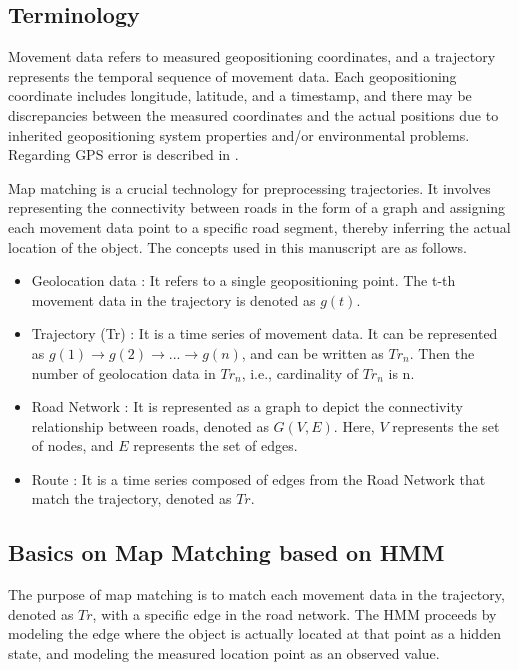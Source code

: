 \documentclass[preprint,12pt]{elsarticle}
\begin{document}
\subsection{Terminology}
\label{sec:sec3:sec1}
Movement data refers to measured geopositioning coordinates, and a trajectory represents the temporal sequence of movement data. Each geopositioning coordinate includes longitude, latitude, and a timestamp, and there may be discrepancies between the measured coordinates and the actual positions due to inherited geopositioning system properties and/or environmental problems. 
Regarding GPS error is described in \cite{gpserror}.

Map matching is a crucial technology for preprocessing trajectories. It involves representing the connectivity between roads in the form of a graph and assigning each movement data point to a specific road segment, thereby inferring the actual location of the object.
The concepts used in this manuscript are as follows.
\begin{itemize}
	\item Geolocation data : It refers to a single geopositioning point. The t-th movement data in the trajectory is denoted as $g(t)$.
	\item Trajectory (Tr) : It is a time series of movement data. It can be represented as $g(1) \rightarrow g(2) \rightarrow ... \rightarrow g(n)$, and can be written as $Tr_n$. Then the number of geolocation data in $Tr_n$, i.e., cardinality of $Tr_n$ is n.
	\item Road Network : It is represented as a graph to depict the connectivity relationship between roads, denoted as $G(V, E)$. Here, $V$ represents the set of nodes, and $E$ represents the set of edges.
	\item Route : It is a time series composed of edges from the Road Network that match the trajectory, denoted as $Tr$.
\end{itemize}

\subsection{Basics on Map Matching based on HMM}
\label{sec:sec3:sec2}
The purpose of map matching is to match each movement data in the trajectory, denoted as $Tr$, with a specific edge in the road network. The HMM proceeds 
 by modeling the edge where the object is actually located at that point as a hidden state, and modeling the measured location point as an observed value.
\end{document}
